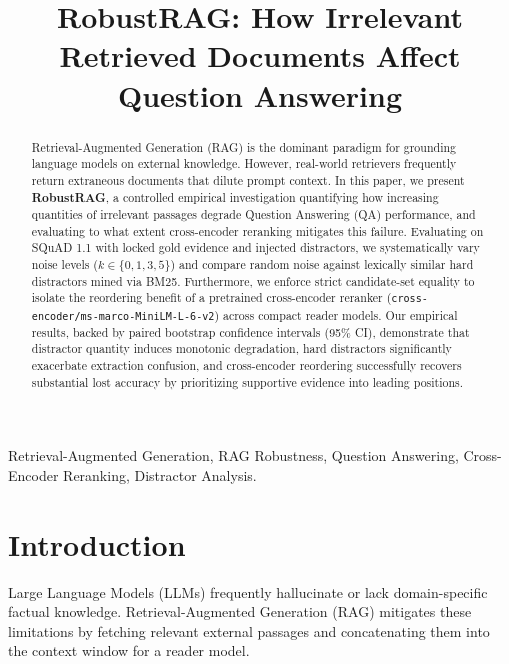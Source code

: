 \documentclass[conference]{IEEEtran}
\begin{document}
\title{RobustRAG: How Irrelevant Retrieved Documents Affect Question Answering}

\author{
}

\maketitle

\begin{abstract}
Retrieval-Augmented Generation (RAG) is the dominant paradigm for grounding language models on external knowledge. However, real-world retrievers frequently return extraneous documents that dilute prompt context. In this paper, we present \textbf{RobustRAG}, a controlled empirical investigation quantifying how increasing quantities of irrelevant passages degrade Question Answering (QA) performance, and evaluating to what extent cross-encoder reranking mitigates this failure. Evaluating on SQuAD 1.1 with locked gold evidence and injected distractors, we systematically vary noise levels ($k \in \{0, 1, 3, 5\}$) and compare random noise against lexically similar hard distractors mined via BM25. Furthermore, we enforce strict candidate-set equality to isolate the reordering benefit of a pretrained cross-encoder reranker (\texttt{cross-encoder/ms-marco-MiniLM-L-6-v2}) across compact reader models. Our empirical results, backed by paired bootstrap confidence intervals (95\% CI), demonstrate that distractor quantity induces monotonic degradation, hard distractors significantly exacerbate extraction confusion, and cross-encoder reordering successfully recovers substantial lost accuracy by prioritizing supportive evidence into leading positions.
\end{abstract}

\begin{IEEEkeywords}
Retrieval-Augmented Generation, RAG Robustness, Question Answering, Cross-Encoder Reranking, Distractor Analysis.
\end{IEEEkeywords}

\section{Introduction}
Large Language Models (LLMs) frequently hallucinate or lack domain-specific factual knowledge. Retrieval-Augmented Generation (RAG) mitigates these limitations by fetching relevant external passages and concatenating them into the context window for a reader model.
\end{document}
